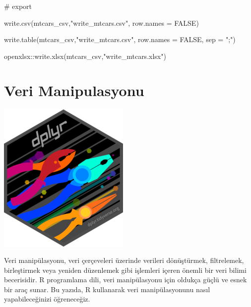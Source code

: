 \documentclass[
  letterpaper,
  DIV=11,
  numbers=noendperiod]{scrreprt}
\newenvironment{Shaded}{\begin{snugshade}}{\end{snugshade}}
\newcommand{\AttributeTok}[1]{\textcolor[rgb]{0.40,0.45,0.13}{#1}}
\newcommand{\CommentTok}[1]{\textcolor[rgb]{0.37,0.37,0.37}{#1}}
\newcommand{\ConstantTok}[1]{\textcolor[rgb]{0.56,0.35,0.01}{#1}}
\newcommand{\FunctionTok}[1]{\textcolor[rgb]{0.28,0.35,0.67}{#1}}
\newcommand{\NormalTok}[1]{\textcolor[rgb]{0.00,0.23,0.31}{#1}}
\newcommand{\SpecialCharTok}[1]{\textcolor[rgb]{0.37,0.37,0.37}{#1}}
\newcommand{\StringTok}[1]{\textcolor[rgb]{0.13,0.47,0.30}{#1}}
\begin{document}
\begin{Shaded}
\begin{Highlighting}[]
\CommentTok{\# export}

\FunctionTok{write.csv}\NormalTok{(mtcars\_csv,}\StringTok{"write\_mtcars.csv"}\NormalTok{,}
          \AttributeTok{row.names =} \ConstantTok{FALSE}\NormalTok{)}

\FunctionTok{write.table}\NormalTok{(mtcars\_csv,}\StringTok{"write\_mtcars.csv"}\NormalTok{,}
            \AttributeTok{row.names =} \ConstantTok{FALSE}\NormalTok{,}
            \AttributeTok{sep =} \StringTok{";"}\NormalTok{)}

\NormalTok{openxlsx}\SpecialCharTok{::}\FunctionTok{write.xlsx}\NormalTok{(mtcars\_csv,}\StringTok{"write\_mtcars.xlsx"}\NormalTok{)}
\end{Highlighting}
\end{Shaded}


\chapter*{Veri Manipulasyonu}\label{part-manipulation}


\begin{center}
\includegraphics{images/dplyr.png}
\end{center}

Veri manipülasyonu, veri çerçeveleri üzerinde verileri dönüştürmek,
filtrelemek, birleştirmek veya yeniden düzenlemek gibi işlemleri içeren
önemli bir veri bilimi becerisidir. R programlama dili, veri
manipülasyonu için oldukça güçlü ve esnek bir araç sunar. Bu yazıda, R
kullanarak veri manipülasyonunu nasıl yapabileceğinizi öğreneceğiz.
\end{document}
